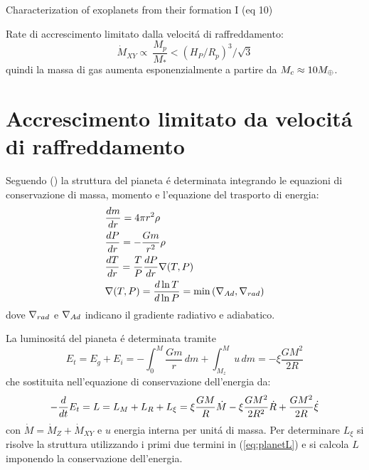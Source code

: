 \begin{workout}
	
\end{workout}


\begin{workout}
	Characterization of exoplanets from their formation I (eq 10)
\end{workout}


\begin{workout}
	Rate di accrescimento limitato dalla velocit\'a di raffreddamento:
	\begin{equation}
	\dot{M}_{XY}\propto\ \frac{M_p}{M_*}<(H_P/R_p)^3/\sqrt{3}
	\end{equation}
	quindi la massa di gas aumenta esponenzialmente a partire da $M_c\approx10\mearth{}$.
\end{workout}

\section{Accrescimento limitato da velocit\'a di raffreddamento}

Seguendo (\cite{mordasini2012characterization}) la struttura del pianeta \'e determinata integrando le equazioni di conservazione di massa, momento e l'equazione del trasporto di energia:
\begin{align}
&\TDy{r}{m}=4\pi r^2\rho\\
&\TDy{r}{P}=-\frac{Gm}{r^2}\rho\\
&\TDy{r}{T}=\frac{T}{P}\TDy{r}{P}\nabla(T,P)\\
&\nabla(T,P)=\TDly{P}{T}=\min{(\nad{},\nrad{})}\\
\end{align}
dove $\nrad{}$ e $\nad{}$ indicano il gradiente radiativo e adiabatico.

La luminosit\'a del pianeta \'e determinata tramite
\begin{equation}
E_t=E_g+E_i=-\int_0^M\frac{Gm}{r}\,dm+\int_{M_z}^Mu\,dm=-\xi\frac{GM^2}{2R}
\end{equation}
che sostituita nell'equazione di conservazione dell'energia da:
\begin{equation}
-\TDof{t}E_t=L=L_M+L_R+L_{\xi}=\xi\frac{GM}{R}\dot{M}-\xi\frac{GM^2}{2R^2}\dot{R}+\frac{GM^2}{2R}\dot{\xi}\label{eq:planetL}
\end{equation}
con $\dot{M}=\dot{M}_Z+\dot{M}_{XY}$ e $u$ energia interna per unit\'a di massa.
Per determinare $L_{\xi}$ si risolve la struttura utilizzando i primi due termini in (\ref{eq:planetL}) e si calcola $L$ imponendo la conservazione dell'energia.

